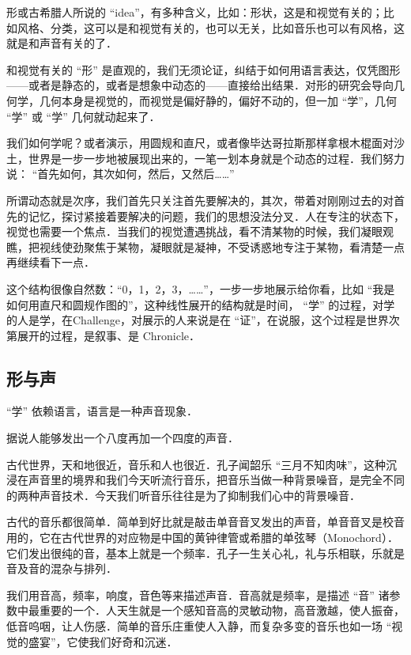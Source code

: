 
形或古希腊人所说的 “idea”，有多种含义，比如：形状，这是和视觉有关的；比如风格、分类，这可以是和视觉有关的，也可以无关，比如音乐也可以有风格，这就是和声音有关的了．

和视觉有关的 “形” 是直观的，我们无须论证，纠结于如何用语言表达，仅凭图形——或者是静态的，或者是想象中动态的——直接给出结果．对形的研究会导向几何学，几何本身是视觉的，而视觉是偏好静的，偏好不动的，但一加 “学”，几何 “学” 或 “学” 几何就动起来了．

我们如何学呢？或者演示，用圆规和直尺，或者像毕达哥拉斯那样拿根木棍面对沙土，世界是一步一步地被展现出来的，一笔一划本身就是个动态的过程．我们努力说： “首先如何，其次如何，然后，又然后……”

所谓动态就是次序，我们首先只关注首先要解决的，其次，带着对刚刚过去的对首先的记忆，探讨紧接着要解决的问题，我们的思想没法分叉．人在专注的状态下，视觉也需要一个焦点．当我们的视觉遭遇挑战，看不清某物的时候，我们凝眼观瞧，把视线使劲聚焦于某物，凝眼就是凝神，不受诱惑地专注于某物，看清楚一点再继续看下一点．

这个结构很像自然数：“0，1，2，3，……”，一步一步地展示给你看，比如 “我是如何用直尺和圆规作图的”，这种线性展开的结构就是时间， “学” 的过程，对学的人是学，在Challenge，对展示的人来说是在 “证”，在说服，这个过程是世界次第展开的过程，是叙事、是 Chronicle．

\subsection{形与声}

“学” 依赖语言，语言是一种声音现象．

据说人能够发出一个八度再加一个四度的声音．

古代世界，天和地很近，音乐和人也很近．孔子闻韶乐 “三月不知肉味”，这种沉浸在声音里的境界和我们今天听流行音乐，把音乐当做一种背景噪音，是完全不同的两种声音技术．今天我们听音乐往往是为了抑制我们心中的背景噪音．

古代的音乐都很简单．简单到好比就是敲击单音音叉发出的声音，单音音叉是校音用的，它在古代世界的对应物是中国的黄钟律管或希腊的单弦琴（Monochord）．它们发出很纯的音，基本上就是一个频率．孔子一生关心礼，礼与乐相联，乐就是音及音的混杂与排列．

我们用音高，频率，响度，音色等来描述声音．音高就是频率，是描述 “音” 诸参数中最重要的一个．人天生就是一个感知音高的灵敏动物，高音激越，使人振奋，低音呜咽，让人伤感．简单的音乐庄重使人入静，而复杂多变的音乐也如一场 “视觉的盛宴”，它使我们好奇和沉迷．

